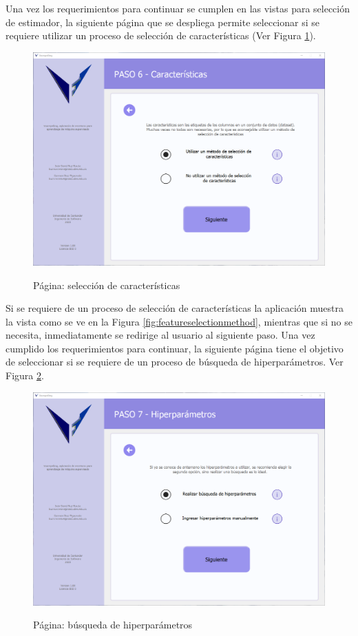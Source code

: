 Una vez los requerimientos para continuar se cumplen en las vistas para selección de estimador, la siguiente página que se despliega permite seleccionar si se requiere utilizar un proceso de selección de características (Ver Figura \ref{fig:wantfeatureselection}).

\begin{figure}[H]
    \centering
    \caption{Página: selección de características}
    \includegraphics[width=\textwidth]{views/want_feature_selection.png}
    \label{fig:wantfeatureselection}
\end{figure}

Si se requiere de un proceso de selección de características la aplicación muestra la vista como se ve en la Figura \ref{fig:featureselectionmethod}, mientras que si no se necesita, inmediatamente se redirige al usuario al siguiente paso. Una vez cumplido los requerimientos para continuar, la siguiente página tiene el objetivo de seleccionar si se requiere de un proceso de búsqueda de hiperparámetros. Ver Figura \ref{fig:wanthiperparametersearch}.

\begin{figure}[H]
    \centering
    \caption{Página: búsqueda de hiperparámetros}
    \includegraphics[width=\textwidth]{views/want_hiperparameter_search.png}
    \label{fig:wanthiperparametersearch}
\end{figure}

